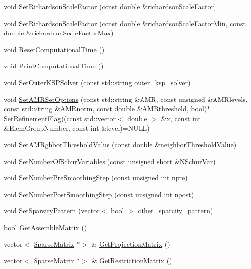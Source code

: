 \begin{DoxyCompactItemize}
\item 
void \mbox{\hyperlink{classfemus_1_1_linear_implicit_system_ab5d0bcdd9023ccfa398e41b751086304}{Set\+Richardson\+Scale\+Factor}} (const double \&richardson\+Scale\+Factor)
\item 
void \mbox{\hyperlink{classfemus_1_1_linear_implicit_system_ad7465a09f546c5a7801a0779805a3933}{Set\+Richardson\+Scale\+Factor}} (const double \&richardson\+Scale\+Factor\+Min, const double \&richardson\+Scale\+Factor\+Max)
\item 
void \mbox{\hyperlink{classfemus_1_1_linear_implicit_system_a7040e65cdf939108d9f8cb3cab176a18}{Reset\+Computational\+Time}} ()
\item 
void \mbox{\hyperlink{classfemus_1_1_linear_implicit_system_acb0ea188e3201517aac9072066906dbc}{Print\+Computational\+Time}} ()
\item 
void \mbox{\hyperlink{classfemus_1_1_linear_implicit_system_a4777685603af1b46ca890fbe2e786f79}{Set\+Outer\+K\+S\+P\+Solver}} (const std\+::string outer\+\_\+ksp\+\_\+solver)
\item 
void \mbox{\hyperlink{classfemus_1_1_linear_implicit_system_aae918be6d07990b18bdf6713759c1cb9}{Set\+A\+M\+R\+Set\+Options}} (const std\+::string \&A\+MR, const unsigned \&A\+M\+Rlevels, const std\+::string \&A\+M\+Rnorm, const double \&A\+M\+Rthreshold, bool($\ast$Set\+Refinement\+Flag)(const std\+::vector$<$ double $>$ \&x, const int \&Elem\+Group\+Number, const int \&level)=N\+U\+LL)
\item 
void \mbox{\hyperlink{classfemus_1_1_linear_implicit_system_a979a7a496da502e54e48d8e0192789a8}{Set\+A\+M\+Rghbor\+Threshold\+Value}} (const double \&neighbor\+Threshold\+Value)
\item 
void \mbox{\hyperlink{classfemus_1_1_linear_implicit_system_a0e60a0d128854b91b1740f656fb7526d}{Set\+Number\+Of\+Schur\+Variables}} (const unsigned short \&N\+Schur\+Var)
\item 
void \mbox{\hyperlink{classfemus_1_1_linear_implicit_system_a5b04e5c05fef4ec2909ab9a959e18bd4}{Set\+Number\+Pre\+Smoothing\+Step}} (const unsigned int npre)
\item 
void \mbox{\hyperlink{classfemus_1_1_linear_implicit_system_ae3a45a0491fcfbfa2fb8116031174c6b}{Set\+Number\+Post\+Smoothing\+Step}} (const unsigned int npost)
\item 
void \mbox{\hyperlink{classfemus_1_1_linear_implicit_system_a84e39c3271fda228ef71104000c2fd99}{Set\+Sparsity\+Pattern}} (vector$<$ bool $>$ other\+\_\+sparcity\+\_\+pattern)
\item 
bool \mbox{\hyperlink{classfemus_1_1_linear_implicit_system_a7e1267a7b74760f606b435afbcc95c3b}{Get\+Assemble\+Matrix}} ()
\item 
vector$<$ \mbox{\hyperlink{classfemus_1_1_sparse_matrix}{Sparse\+Matrix}} $\ast$$>$ \& \mbox{\hyperlink{classfemus_1_1_linear_implicit_system_a709a6fb6e4e5eb98fb9c0e6de24da964}{Get\+Projection\+Matrix}} ()
\item 
vector$<$ \mbox{\hyperlink{classfemus_1_1_sparse_matrix}{Sparse\+Matrix}} $\ast$$>$ \& \mbox{\hyperlink{classfemus_1_1_linear_implicit_system_a560cf9fb486ce2fb253ca32df4435b64}{Get\+Restriction\+Matrix}} ()
\end{DoxyCompactItemize}
